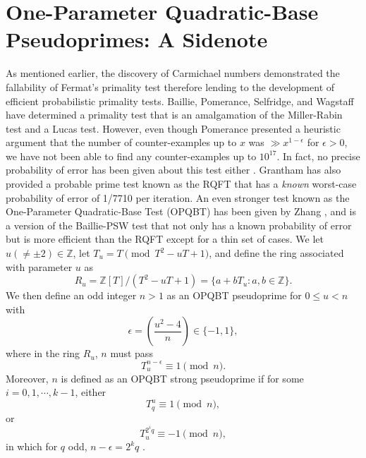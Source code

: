 \documentclass[11pt]{article}
\theoremstyle{plain}
\theoremstyle{definition}
\theoremstyle{remark}
\numberwithin{equation}{subsection}
\begin{document}
\section{One-Parameter Quadratic-Base Pseudoprimes: A Sidenote}
As mentioned earlier, the discovery of Carmichael numbers demonstrated the fallability of Fermat's primality test therefore lending to the development of efficient probabilistic primality tests. Baillie, Pomerance, Selfridge, and Wagstaff \cite{10} \cite{25} have determined a primality test that is an amalgamation of the Miller-Rabin test and a Lucas test. However, even though Pomerance \cite{26} presented a heuristic argument that the number of counter-examples up to $x$ was $\gg x^{1-\epsilon}$ for $\epsilon > 0$, we have not been able to find any counter-examples up to $10^{17}$. In fact, no precise probability of error has been given about this test either \cite{24}. \newline
\indent Grantham \cite{27} has also provided a probable prime test known as the RQFT that has a \emph{known} worst-case probability of error of 1/7710 per iteration. \newline
\indent An even stronger test known as the One-Parameter Quadratic-Base Test (OPQBT) has been given by Zhang \cite{24}, and is a version of the Baillie-PSW test that not only has a known probability of error but is more efficient than the RQFT except for a thin set of cases. We let $u (\ne \pm 2) \in \mathbb{Z}$, let $T_u = T \pmod{T^2-uT+1}$, and define the ring associated with parameter $u$ as
\begin{equation*}
R_u = \mathbb{Z}[T]/(T^2-uT+1) = \{a+bT_u:a,b \in \mathbb{Z}\}.
\end{equation*}
We then define an odd integer $n > 1$ as an OPQBT pseudoprime for $0 \le u < n$ with
\begin{equation*}
\epsilon = \left(\frac{u^2-4}{n}\right) \in \{-1,1\},
\end{equation*}
where in the ring $R_u$, $n$ must pass
\begin{equation}
T_{u}^{n-\epsilon} \equiv 1 \pmod n.
\end{equation}
\indent Moreover, $n$ is defined as an OPQBT strong pseudoprime if for some $i = 0, 1, \cdots, k-1$, either
\begin{equation}
T_q^u \equiv 1 \pmod n,
\end{equation}
or
\begin{equation}
T_u^{2^i q} \equiv -1 \pmod n,
\end{equation}
in which for $q$ odd, $n-\epsilon = 2^k q$ \cite{24}. \newline
\end{document}
